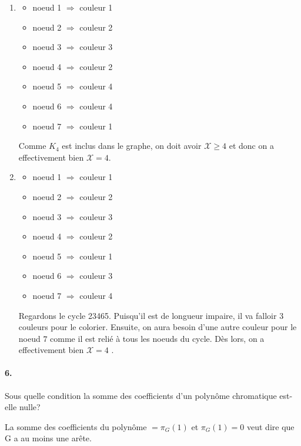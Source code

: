 \begin{solution}
  \begin{enumerate}
    \item 
    \begin{itemize}
    \item noeud 1 $\Rightarrow$ couleur 1
    \item noeud 2 $\Rightarrow$ couleur 2
    \item noeud 3 $\Rightarrow$ couleur 3
    \item noeud 4 $\Rightarrow$ couleur 2
    \item noeud 5 $\Rightarrow$ couleur 4
    \item noeud 6 $\Rightarrow$ couleur 4
    \item noeud 7 $\Rightarrow$ couleur 1
    \end{itemize}
    Comme $K_4$ est inclus dans le graphe, on doit avoir $\mathcal{X} \geq 4$  et donc on a effectivement bien $\mathcal{X} = 4$.
    \item
    \begin{itemize}
    \item noeud 1 $\Rightarrow$ couleur 1
    \item noeud 2 $\Rightarrow$ couleur 2
    \item noeud 3 $\Rightarrow$ couleur 3
    \item noeud 4 $\Rightarrow$ couleur 2
    \item noeud 5 $\Rightarrow$ couleur 1
    \item noeud 6 $\Rightarrow$ couleur 3
    \item noeud 7 $\Rightarrow$ couleur 4
    \end{itemize}
    Regardons le cycle 23465. Puisqu'il est de longueur impaire, il va falloir 3 couleurs pour le colorier. Ensuite, on aura besoin d'une autre couleur pour le noeud $7$ comme il est relié à tous les noeuds du cycle. Dès lors, on a effectivement bien $\mathcal{X} = 4$ .
     \end{enumerate}
\end{solution}

\paragraph{6. } Sous quelle condition la somme des coefficients d'un polynôme chromatique est-elle nulle?
\begin{solution}
  La somme des coefficients du polynôme $= \pi_G(1)$ et $\pi_G(1) = 0$ veut dire que G a au moins une arête.
\end{solution}

